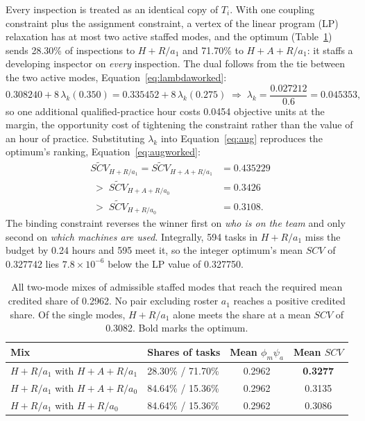 \documentclass[utf8]{FrontiersinHarvard}
\begin{document}
	Every inspection is treated as an identical copy of $T_i$. With one coupling constraint plus the assignment constraint, a vertex of the linear program (LP) relaxation has at most two active staffed modes, and the optimum (Table~\ref{tab:worked-mix}) sends 28.30\% of inspections to $H{+}R/a_1$ and 71.70\% to $H{+}A{+}R/a_1$: it staffs a developing inspector on \textit{every} inspection. The dual follows from the tie between the two active modes, Equation~\eqref{eq:lambdaworked}:
	\begin{equation}
		0.308240 + 8\,\lambda_k(0.350) = 0.335452 + 8\,\lambda_k(0.275)
		\;\Longrightarrow\;
		\lambda_k = \frac{0.027212}{0.6} = 0.045353 ,
		\label{eq:lambdaworked}
	\end{equation}
	so one additional qualified-practice hour costs 0.0454 objective units at the margin, the opportunity cost of tightening the constraint rather than the value of an hour of practice. Substituting $\lambda_k$ into Equation~\eqref{eq:aug} reproduces the optimum's ranking, Equation~\eqref{eq:augworked}:
	\begin{equation}
		\begin{split}
			\widetilde{SCV}_{H+R/a_1} = \widetilde{SCV}_{H+A+R/a_1} &= 0.435229\\
			\;>\;\widetilde{SCV}_{H+A+R/a_0} &= 0.3426\\
			\;>\;\widetilde{SCV}_{H+R/a_0} &= 0.3108 .
		\end{split}
		\label{eq:augworked}
	\end{equation}
	The binding constraint reverses the winner first on \textit{who is on the team} and only second on \textit{which machines are used}. Integrally, 594 tasks in $H{+}R/a_1$ miss the budget by 0.24 hours and 595 meet it, so the integer optimum's mean $SCV$ of 0.327742 lies $7.8\times10^{-6}$ below the LP value of 0.327750.

	\begin{table}[!htbp]
		\caption{All two-mode mixes of admissible staffed modes that reach the required mean credited share of 0.2962. No pair excluding roster $a_1$ reaches a positive credited share. Of the single modes, $H{+}R/a_1$ alone meets the share at a mean $SCV$ of 0.3082. Bold marks the optimum.}
		\label{tab:worked-mix}
		\small
		\begin{tabular}{@{}llcc@{}}
			\toprule
			\textbf{Mix} & \textbf{Shares of tasks} & \textbf{Mean $\phi_m\psi_a$} & \textbf{Mean $SCV$}\\
			\midrule
			$H{+}R/a_1$ with $H{+}A{+}R/a_1$ & 28.30\% / 71.70\% & 0.2962 & \textbf{0.3277}\\
			$H{+}R/a_1$ with $H{+}A{+}R/a_0$ & 84.64\% / 15.36\% & 0.2962 & 0.3135\\
			$H{+}R/a_1$ with $H{+}R/a_0$ & 84.64\% / 15.36\% & 0.2962 & 0.3086\\
			\bottomrule
		\end{tabular}
	\end{table}
\end{document}
